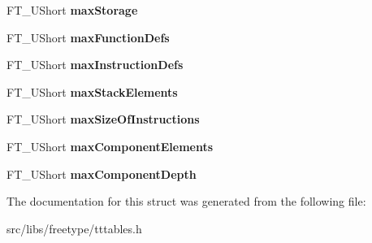 \begin{DoxyCompactItemize}
\item 
\hypertarget{struct_t_t___max_profile___a502a8579e3d358f3c00776ed0cc8a168}{
FT\_\-UShort {\bfseries maxStorage}}
\label{struct_t_t___max_profile___a502a8579e3d358f3c00776ed0cc8a168}

\item 
\hypertarget{struct_t_t___max_profile___acc24e822a62bbfaa86d36f691fcde60b}{
FT\_\-UShort {\bfseries maxFunctionDefs}}
\label{struct_t_t___max_profile___acc24e822a62bbfaa86d36f691fcde60b}

\item 
\hypertarget{struct_t_t___max_profile___a3f7bd433baede417293415cf60f20d8f}{
FT\_\-UShort {\bfseries maxInstructionDefs}}
\label{struct_t_t___max_profile___a3f7bd433baede417293415cf60f20d8f}

\item 
\hypertarget{struct_t_t___max_profile___a2df9b9ff2a5a9daaa7c3d40fe024637f}{
FT\_\-UShort {\bfseries maxStackElements}}
\label{struct_t_t___max_profile___a2df9b9ff2a5a9daaa7c3d40fe024637f}

\item 
\hypertarget{struct_t_t___max_profile___ac458411198b09d303ec8ae206e6926b6}{
FT\_\-UShort {\bfseries maxSizeOfInstructions}}
\label{struct_t_t___max_profile___ac458411198b09d303ec8ae206e6926b6}

\item 
\hypertarget{struct_t_t___max_profile___a110e6d735610c6d8fd89221d03440c32}{
FT\_\-UShort {\bfseries maxComponentElements}}
\label{struct_t_t___max_profile___a110e6d735610c6d8fd89221d03440c32}

\item 
\hypertarget{struct_t_t___max_profile___a9ae1f117c954e0711b03f1675d6191d9}{
FT\_\-UShort {\bfseries maxComponentDepth}}
\label{struct_t_t___max_profile___a9ae1f117c954e0711b03f1675d6191d9}

\end{DoxyCompactItemize}


The documentation for this struct was generated from the following file:\begin{DoxyCompactItemize}
\item 
src/libs/freetype/tttables.h\end{DoxyCompactItemize}

